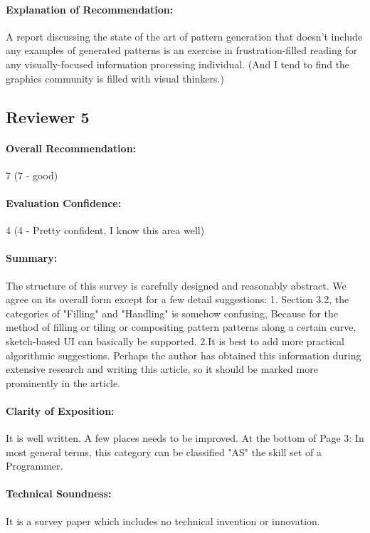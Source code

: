 \documentclass{egpubl}
\newcommand{\rev}[2]{{\color{greenrev}\textsuperscript{#1}#2}}
\renewcommand{\rev}[2]{{#2}}
\begin{document}
\paragraph*{Explanation of Recommendation:} A report discussing the state of the art of pattern generation that doesn't include any examples of generated patterns is an exercise in frustration-filled reading for any visually-focused information processing individual. (And I tend to find the graphics community is filled with visual thinkers.)


\rev{Comments}{}


\subsection*{Reviewer 5} 

\paragraph*{Overall Recommendation:} 7 (7 - good)
\paragraph*{Evaluation Confidence:} 4 (4 - Pretty confident, I know this area well)
\paragraph*{Summary:} The structure of this survey is carefully designed and reasonably abstract. We agree on its overall form except for a few detail suggestions:
1. Section 3.2, the categories of "Filling" and "Handling" is somehow confusing, Because for the method of filling or tiling or compositing pattern patterns along a certain curve, sketch-based UI can basically be supported.
2.It is best to add more practical algorithmic suggestions. Perhaps the author has obtained this information during extensive research and writing this article, so it should be marked more prominently in the article.
\paragraph*{Clarity of Exposition:} It is well written.  A few places needs to be improved.
At the bottom of Page 3:  In most general terms, this category can be classified  "AS" the skill set of a Programmer.
\paragraph*{Technical Soundness:} It is a survey paper which includes no technical invention or innovation.
\end{document}
